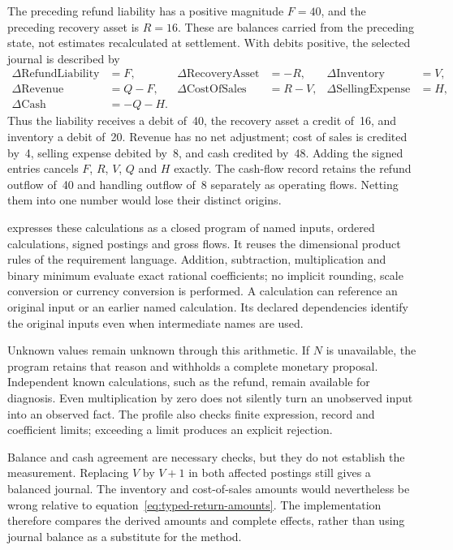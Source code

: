 The preceding refund liability has a positive magnitude $F=40$, and the
preceding recovery asset is $R=16$. These are balances carried from the preceding
state, not estimates recalculated at settlement. With debits positive, the
selected journal is described by
\begin{equation}
\begin{aligned}
 \Delta\mathrm{RefundLiability}&=F,&
 \Delta\mathrm{RecoveryAsset}&=-R,&
 \Delta\mathrm{Inventory}&=V,\\
 \Delta\mathrm{Revenue}&=Q-F,&
 \Delta\mathrm{CostOfSales}&=R-V,&
 \Delta\mathrm{SellingExpense}&=H,\\
 \Delta\mathrm{Cash}&=-Q-H.
\end{aligned}
\label{eq:typed-return-journal}
\end{equation}
Thus the liability receives a debit of~40, the recovery asset a credit of~16,
and inventory a debit of~20. Revenue has no net adjustment; cost of sales is
credited by~4, selling expense debited by~8, and cash credited by~48. Adding the
signed entries cancels $F$, $R$, $V$, $Q$ and $H$ exactly. The cash-flow record
retains the refund outflow of~40 and handling outflow of~8 separately as operating
flows. Netting them into one number would lose their distinct origins.

 expresses these calculations as a closed program
of named inputs, ordered calculations, signed postings and gross flows. It
reuses the dimensional product rules of the requirement language. Addition,
subtraction, multiplication and binary minimum evaluate exact rational
coefficients; no implicit rounding, scale conversion or currency conversion is
performed. A calculation can reference an original input or an earlier named
calculation. Its declared dependencies identify the original inputs even when
intermediate names are used.

Unknown values remain unknown through this arithmetic. If $N$ is unavailable,
the program retains that reason and withholds a complete monetary proposal.
Independent known calculations, such as the refund, remain available for
diagnosis. Even multiplication by zero does not silently turn an unobserved
input into an observed fact. The profile also checks finite expression, record
and coefficient limits; exceeding a limit produces an explicit rejection.

Balance and cash agreement are necessary checks, but they do not establish the
measurement. Replacing $V$ by $V+1$ in both affected postings still gives a
balanced journal. The inventory and cost-of-sales amounts would nevertheless
be wrong relative to equation~\eqref{eq:typed-return-amounts}. The implementation
therefore compares the derived amounts and complete effects, rather than using
journal balance as a substitute for the method.

